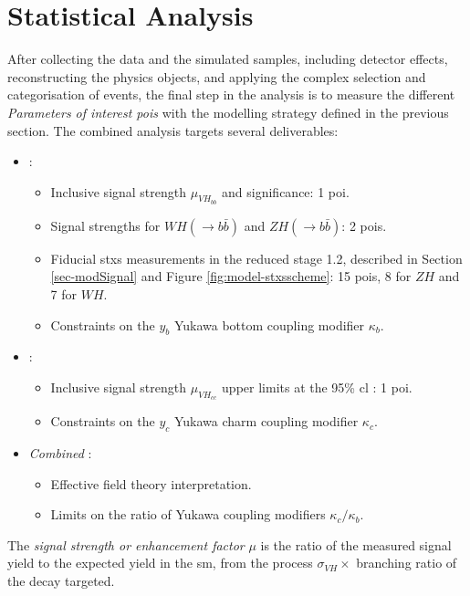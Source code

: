 \section{Statistical Analysis}\label{sec-fitFramework}
After collecting the data and the simulated samples, including detector effects, reconstructing the physics objects, and applying the complex selection and categorisation of events, the final step in the analysis is to measure the different \textit{Parameters of interest \glspl{poi}} with the modelling strategy defined in the previous section. The combined analysis targets several deliverables:
\begin{itemize}[leftmargin=*]
\item \textit{\vhb}: 
    \begin{itemize}
        \item Inclusive signal strength $\mu_{VH_{bb}}$ and significance: 1 \gls{poi}.
        \item Signal strengths for $WH(\rightarrow b\bar{b})$ and $ZH(\rightarrow b\bar{b})$: 2 \glspl{poi}.
        \item Fiducial \gls{stxs} measurements in the reduced stage 1.2, described in Section \ref{sec-modSignal} and Figure \ref{fig:model-stxsscheme}: 15 \glspl{poi}, 8 for $ZH$ and 7 for $WH$.
        \item Constraints on the $y_b$ Yukawa bottom coupling modifier $\kappa_b$. 
    \end{itemize}
\item \textit{\vhc}:
    \begin{itemize}
        \item Inclusive signal strength $\mu_{VH_{cc}}$ upper limits at the 95\% \gls{cl} : 1 \gls{poi}.
        \item Constraints on the $y_c$ Yukawa charm coupling modifier $\kappa_c$. 
    \end{itemize}
\item \textit{Combined \vhbc}: 
    \begin{itemize}
        \item Effective field theory interpretation.
        \item Limits on the ratio of Yukawa coupling modifiers $\kappa_c / \kappa_b$.
    \end{itemize}
\end{itemize}

The \textit{signal strength or enhancement factor} $\mu$ is the ratio of the measured signal yield to the expected yield in the \gls{sm}, from the process $\sigma_{VH} \times$ branching ratio of the decay targeted.

